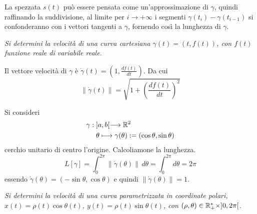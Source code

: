 La spezzata $s(t)$ può essere pensata come un'approssimazione di $\gamma$, 
quindi 
raffinando la suddivisione, al limite per $i\longrightarrow +\infty$ i segmenti 
$\gamma(t_i)-\gamma(t_{i-1})$ si confonderanno con i vettori tangenti a 
$\gamma$, 
fornendo così la lunghezza di $\gamma$.

\begin{esempio}
  \textit{Si determini la velocità di una curva cartesiana $\gamma(t) = 
(t,f(t))$, con $f(t)$
  funzione reale di variabile reale.}
\end{esempio}
\begin{sol}
  Il vettore velocità di $\gamma$ è $\dot \gamma(t) = \left(1, 
\frac{df(t)}{dt}\right)$. Da cui
  \[
    \|\dot\gamma(t) \| =\sqrt{1+\left(\frac{df(t)}{dt}\right)^2}
  \]
\end{sol}

\begin{esempio}
  Si consideri 
  \[\begin{aligned}
    \gamma: & \; ]a,b[ \longrightarrow \mathbb{R}^{2}\\
    &\;  \theta\longmapsto \gamma(\theta):= (\cos\theta,\sin\theta)
  \end{aligned}\]
  cerchio unitario di centro l'origine. Calcoliamone la lunghezza.
  \[
    L[\gamma] = \int_0^{2\pi} \|\dot\gamma(\theta)\|\, d\theta = \int_0^{2\pi} 
d\theta = 2\pi
  \]
  essendo $\dot\gamma(\theta) = (-\sin\theta,\cos\theta)$ e quindi 
$\|\dot\gamma(\theta)\|=1$.
\end{esempio}

\begin{exercise}
  \textit{Si determini la velocità di una curva parametrizzata in coordinate 
polari, 
  $x(t)= \rho(t)\cos\theta(t)$, $y(t)= \rho(t)\sin\theta(t)$, con 
$(\rho,\theta)\in \mathbb{R}^{*}_+\times]0,2\pi[$.}
\end{exercise}

